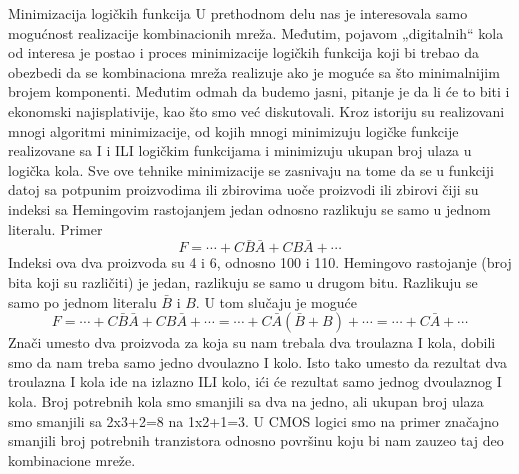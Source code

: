 \begin{frame}[label=02-s032]{Minimizacija logičkih funkcija}
\fontsize{9}{10.3}\selectfont
\setlength{\parskip}{3pt}
\setlength{\abovedisplayskip}{3pt}\setlength{\belowdisplayskip}{3pt}
U prethodnom delu nas je interesovala samo mogućnost realizacije kombinacionih mreža. Međutim, pojavom „digitalnih“ kola od interesa je postao i proces \alert{minimizacije logičkih funkcija} koji bi trebao da obezbedi da se kombinaciona mreža realizuje ako je moguće sa što minimalnijim brojem komponenti. Međutim odmah da budemo jasni, pitanje je da li će to biti i ekonomski najisplativije, kao što smo već diskutovali. Kroz istoriju su realizovani mnogi algoritmi minimizacije, od kojih mnogi minimizuju logičke funkcije realizovane sa I i ILI logičkim funkcijama i minimizuju ukupan broj ulaza u logička kola. Sve ove tehnike minimizacije se zasnivaju na tome da se u funkciji datoj sa potpunim proizvodima ili zbirovima uoče proizvodi ili zbirovi čiji su \alert{indeksi sa Hemingovim rastojanjem jedan} odnosno razlikuju se samo u jednom literalu. Primer
\[
F=\cdots+C\bar B\bar A+CB\bar A+\cdots
\]
Indeksi ova dva proizvoda su 4 i 6, odnosno 100 i 110. Hemingovo rastojanje (broj bita koji su različiti) je jedan, razlikuju se samo u drugom bitu. Razlikuju se samo po jednom literalu \(\bar B\) i \(B\). U tom slučaju je moguće
\[
F=\cdots+C\bar B\bar A+CB\bar A+\cdots=\cdots+C\bar A(\bar B+B)+\cdots=\cdots+C\bar A+\cdots
\]
Znači umesto dva proizvoda za koja su nam trebala dva troulazna I kola, dobili smo da nam treba samo jedno dvoulazno I kolo. Isto tako umesto da rezultat dva troulazna I kola ide na izlazno ILI kolo, ići će rezultat samo jednog dvoulaznog I kola. Broj potrebnih kola smo smanjili sa dva na jedno, ali \alert{ukupan broj ulaza smo smanjili sa 2x3+2=8 na 1x2+1=3}. U CMOS logici smo na primer \alert{značajno smanjili broj potrebnih tranzistora odnosno površinu} koju bi nam zauzeo taj deo kombinacione mreže.
\end{frame}
